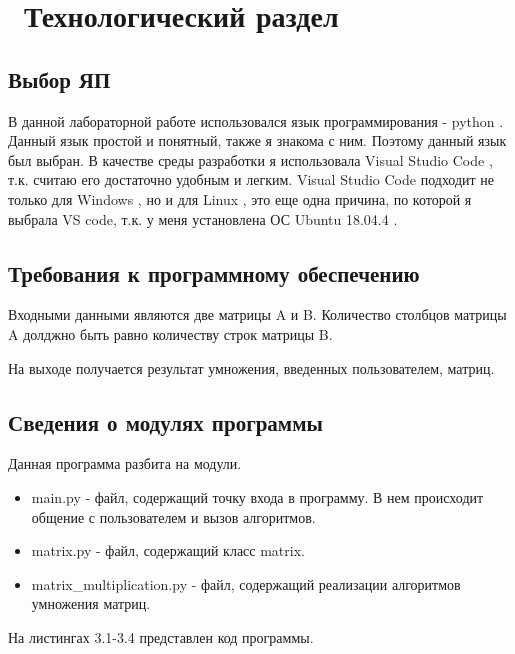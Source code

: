 \chapter{ Технологический раздел}
\label{cha:design}

\section{Выбор ЯП}

В данной лабораторной работе использовался язык программирования - python \cite{bib1}.
Данный язык простой и понятный, также я знакома с ним.
Поэтому данный язык был выбран. 
В качестве среды разработки я использовала Visual Studio Code \cite{bib2}, т.к. считаю его достаточно удобным и легким.
Visual Studio Code подходит не только для  Windows \cite{bib3}, но и для Linux \cite{bib4}, это еще одна причина, по которой я выбрала VS code, т.к. у меня установлена ОС Ubuntu 18.04.4 \cite{bib5}.

\section{Требования к программному обеспечению}

Входными данными являются две матрицы A и B.
Количество столбцов матрицы A долджно быть равно количеству строк матрицы B. 

На выходе получается результат умножения, введенных пользователем, матриц.

\section{Сведения о модулях программы}

Данная программа разбита на модули.

\begin{itemize}
    \item main.py - файл, содержащий точку входа в программу. В нем происходит общение с пользователем и вызов алгоритмов.
    \item matrix.py - файл, содержащий класс matrix.
    \item matrix\_multiplication.py - файл, содержащий реализации алгоритмов умножения матриц.
\end{itemize}

На листингах 3.1-3.4 представлен код программы.


